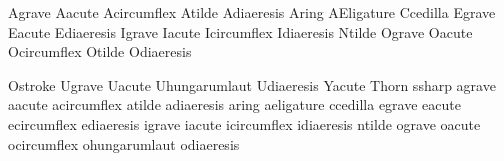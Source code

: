 


\startencoding[uc]

 Agrave        {}
 Aacute        {}
 Acircumflex   {}
 Atilde        {}
 Adiaeresis    {}
 Aring         {}
 AEligature    {}
 Ccedilla      {}
 Egrave        {}
 Eacute        {}
 Ediaeresis    {}
 Igrave        {}
 Iacute        {}
 Icircumflex   {}
 Idiaeresis    {}
 Ntilde        {}
 Ograve        {}
 Oacute        {}
 Ocircumflex   {}
 Otilde        {}
 Odiaeresis    {}

 Ostroke       {}
 Ugrave        {}
 Uacute        {}
 Uhungarumlaut {}
 Udiaeresis    {}
 Yacute        {}
 Thorn         {}
 ssharp        {}
 agrave        {}
 aacute        {}
 acircumflex   {}
 atilde        {}
 adiaeresis    {}
 aring         {}
 aeligature    {}
 ccedilla      {}
 egrave        {}
 eacute        {}
 ecircumflex   {}
 ediaeresis    {}
 igrave        {}
 iacute        {}
 icircumflex   {}
 idiaeresis    {}
 ntilde        {}
 ograve        {}
 oacute        {}
 ocircumflex   {}
 ohungarumlaut {}
 odiaeresis    {}

